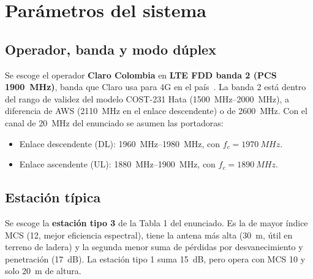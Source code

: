 \documentclass[11pt,letterpaper]{article}
\begin{document}
\section{Parámetros del sistema}

\subsection{Operador, banda y modo dúplex}

Se escoge el operador \textbf{Claro Colombia} en \textbf{LTE FDD banda 2 (PCS \SI{1900}{MHz})}, banda que Claro usa para 4G en el país~\cite{kimovil}. La banda 2 está dentro del rango de validez del modelo COST-231 Hata (\SIrange{1500}{2000}{MHz}), a diferencia de AWS (\SI{2110}{MHz} en el enlace descendente) o de \SI{2600}{MHz}. Con el canal de \SI{20}{MHz} del enunciado se asumen las portadoras:
\begin{itemize}
  \item Enlace descendente (DL): \SIrange{1960}{1980}{MHz}, con $f_c = \SI{1970}{MHz}$.
  \item Enlace ascendente (UL): \SIrange{1880}{1900}{MHz}, con $f_c = \SI{1890}{MHz}$.
\end{itemize}

\subsection{Estación típica}

Se escoge la \textbf{estación tipo 3} de la Tabla 1 del enunciado. Es la de mayor índice MCS (12, mejor eficiencia espectral), tiene la antena más alta (\SI{30}{m}, útil en terreno de ladera) y la segunda menor suma de pérdidas por desvanecimiento y penetración (\SI{17}{dB}). La estación tipo 1 suma \SI{15}{dB}, pero opera con MCS 10 y solo \SI{20}{m} de altura.
\end{document}
